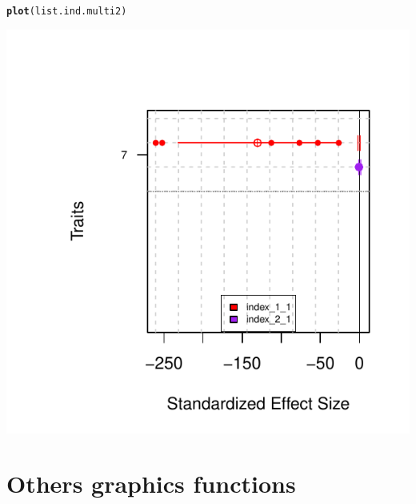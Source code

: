 \documentclass[12pt]{article}\usepackage[]{graphicx}\usepackage[]{color}
\makeatletter
\def\maxwidth{ %
  \ifdim\Gin@nat@width>\linewidth
    \linewidth
  \else
    \Gin@nat@width
  \fi
}
\newcommand{\hlstd}[1]{\textcolor[rgb]{0.345,0.345,0.345}{#1}}%
\newcommand{\hlkwd}[1]{\textcolor[rgb]{0.737,0.353,0.396}{\textbf{#1}}}%
\newenvironment{kframe}{%
 \def\at@end@of@kframe{}%
 \ifinner\ifhmode%
  \def\at@end@of@kframe{\end{minipage}}%
  \begin{minipage}{\columnwidth}%
 \fi\fi%
 \def\FrameCommand##1{\hskip\@totalleftmargin \hskip-\fboxsep
 \colorbox{shadecolor}{##1}\hskip-\fboxsep
     \hskip-\linewidth \hskip-\@totalleftmargin \hskip\columnwidth}%
 \MakeFramed {\advance\hsize-\width
   \@totalleftmargin\z@ \linewidth\hsize
   \@setminipage}}%
 {\par\unskip\endMakeFramed%
 \at@end@of@kframe}
\newenvironment{knitrout}{}{} %
\makeatother
\begin{document}
\begin{knitrout}
\color{fgcolor}\begin{kframe}
\begin{alltt}
\hlkwd{plot}\hlstd{(list.ind.multi2)}
\end{alltt}
\end{kframe}
\includegraphics[width=\maxwidth]{figure/unnamed-chunk-52} 

\end{knitrout}

\section{Others graphics functions}
\end{document}
